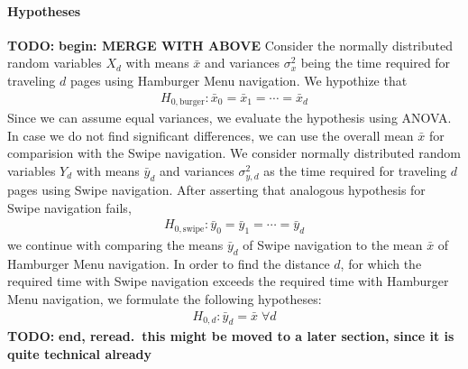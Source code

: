 \documentclass{sig-alternate-05-2015}
\newcommand{\todo}{\textbf{TODO:} \textbf}
\begin{document}
\paragraph{Hypotheses}
\todo{begin: MERGE WITH ABOVE}
Consider the normally distributed random variables $X_d$ with means $\bar x$ and
variances $\sigma_x^2$ being the time required for traveling $d$ pages using Hamburger
Menu navigation.
We hypothize that
\begin{align*}
  H_{0, \text{burger}}: \bar x_0 = \bar x_1 = \cdots = \bar x_d
\end{align*}
Since we can assume equal variances,
we evaluate the hypothesis using {ANOVA}.
In case we do not find significant differences, we can use the overall mean
$\bar x$ for comparision with the Swipe navigation. 
We consider normally
distributed random variables $Y_d$ with means $\bar y_d$ and variances $\sigma_{y,d}^2$ as the
time required for traveling $d$ pages using Swipe navigation. 
After asserting
that analogous hypothesis for Swipe navigation fails,
\begin{align*}
  H_{0, \text{swipe}}: \bar y_0 = \bar y_1= \cdots = \bar y_d
\end{align*}
we continue with comparing the means $\bar y_d$ of Swipe navigation to the
mean $\bar x$ of Hamburger Menu navigation.  In order to find the distance
$d$, for which the required time with Swipe navigation exceeds the required
time with Hamburger Menu navigation, we formulate the following hypotheses:
\begin{align*}
  H_{0,d} : \bar y_d = \bar x \;\forall d
\end{align*}
\todo{end, reread.\ this might be moved to a later section, since it is
quite technical already}
\end{document}
